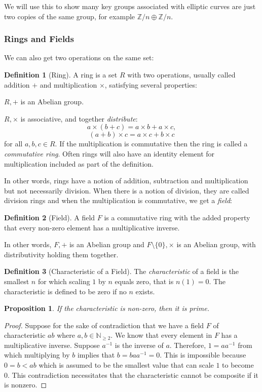 \documentclass{article}
\newtheorem{proposition}{Proposition}[section]
\theoremstyle{definition}
\newtheorem{definition}{Definition}[section]
\theoremstyle{definition}
\theoremstyle{definition}
\newcommand{\Z}{\mathbb{Z}}
\newcommand{\N}{\mathbb{N}}
\begin{document}
We will use this to show many key groups associated with elliptic curves are just two copies of the same group, for example $\Z/n\oplus \Z/n$.
   

\subsubsection{Rings and Fields}
We can also get two operations on the same set:

\begin{definition} [Ring]
    A ring is a set $R$ with two operations, usually called addition $+$ and multiplication $\times$, satisfying several properties:

    $R, +$ is an Abelian group.

    $R, \times$ is associative, and together \emph{distribute}:
    $$a\times (b+c)=a\times b+a\times c,$$
    $$(a+b)\times c=a\times c+b\times c$$
    for all $a,b,c\in R.$ If the multiplication is commutative then the ring is called a \emph{commutative ring}. Often rings will also have an identity element for multiplication included as part of the definition.
\end{definition}

In other words, rings have a notion of addition, subtraction and multiplication but not necessarily division. When there is a notion of division, they are called division rings and when the multiplication is commutative, we get a \emph{field}:

\begin{definition} [Field]
    A field $F$ is a commutative ring with the added property that every non-zero element has a multiplicative inverse.
\end{definition}

In other words, $F,+$ is an Abelian group and $F\setminus\{0\}, \times$ is an Abelian group, with distributivity holding them together.

\begin{definition}
    [Characteristic of a Field] The \emph{characteristic} of a field is the smallest $n$ for which scaling $1$ by $n$ equals zero, that is $n(1)=0$. The characteristic is defined to be zero if no $n$ exists.
\begin{proposition}
    If the characteristic is non-zero, then it is prime. 
\end{proposition}
    
    \begin{proof}
        Suppose for the sake of contradiction that we have a field $F$ of characteristic $ab$ where $a,b\in \N_{\geq2}$. We know that every element in $F$ has a multiplicative inverse. Suppose $a^{-1}$ is the inverse of $a$. Therefore, $1= aa^{-1}$ from which multiplying by $b$ implies that $b= baa^{-1}=0$. This is impossible because $0=b<ab$ which is assumed to be the smallest value that can scale $1$ to become $0$. This contradiction necessitates that the characteristic cannot be composite if it is nonzero.
    \end{proof}

\end{definition}
\end{document}
